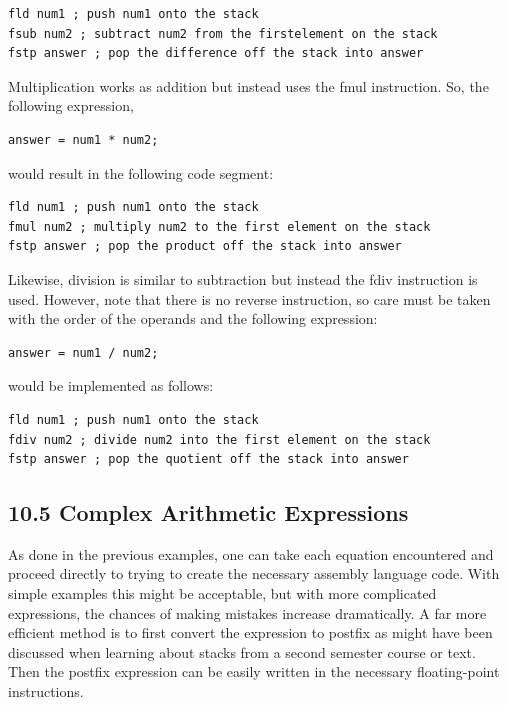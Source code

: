 \documentclass[10pt]{article}
\begin{document}
\begin{verbatim}
fld num1 ; push num1 onto the stack
fsub num2 ; subtract num2 from the firstelement on the stack
fstp answer ; pop the difference off the stack into answer
\end{verbatim}

Multiplication works as addition but instead uses the fmul instruction. So, the following expression,

\begin{verbatim}
answer = num1 * num2;
\end{verbatim}

would result in the following code segment:

\begin{verbatim}
fld num1 ; push num1 onto the stack
fmul num2 ; multiply num2 to the first element on the stack
fstp answer ; pop the product off the stack into answer
\end{verbatim}

Likewise, division is similar to subtraction but instead the fdiv instruction is used. However, note that there is no reverse instruction, so care must be taken with the order of the operands and the following expression:

\begin{verbatim}
answer = num1 / num2;
\end{verbatim}

would be implemented as follows:

\begin{verbatim}
fld num1 ; push num1 onto the stack
fdiv num2 ; divide num2 into the first element on the stack
fstp answer ; pop the quotient off the stack into answer
\end{verbatim}

\subsection*{10.5 Complex Arithmetic Expressions}
As done in the previous examples, one can take each equation encountered and proceed directly to trying to create the necessary assembly language code. With simple examples this might be acceptable, but with more complicated expressions, the chances of making mistakes increase dramatically. A far more efficient method is to first convert the expression to postfix as might have been discussed when learning about stacks from a second semester course or text. Then the postfix expression can be easily written in the necessary floating-point instructions.
\end{document}
